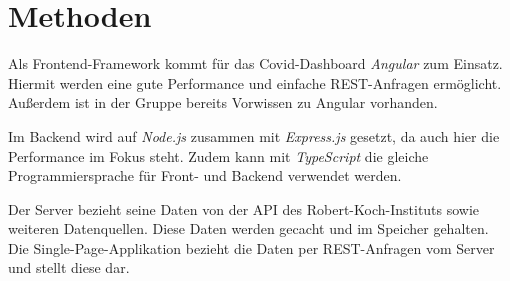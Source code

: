 \documentclass[conference]{IEEEtran}
\begin{document}
\section{Methoden}
Als Frontend-Framework kommt für das Covid-Dashboard \textit{Angular} zum Einsatz. Hiermit werden eine gute Performance und einfache REST-Anfragen ermöglicht. Außerdem ist in der Gruppe bereits Vorwissen zu Angular vorhanden.

Im Backend wird auf \textit{Node.js} zusammen mit \textit{Express.js} gesetzt, da auch hier die Performance im Fokus steht. Zudem kann mit \textit{TypeScript} die gleiche Programmiersprache für Front- und Backend verwendet werden.

Der Server bezieht seine Daten von der API des Robert-Koch-Instituts sowie weiteren Datenquellen. Diese Daten werden gecacht und im Speicher gehalten. Die Single-Page-Applikation bezieht die Daten per REST-Anfragen vom Server und stellt diese dar.
\end{document}
